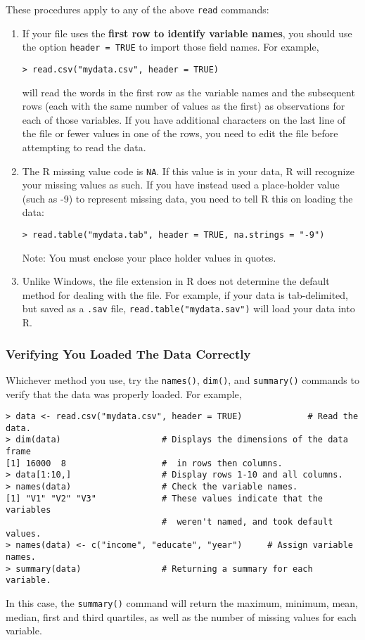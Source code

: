 These procedures apply to any of the above {\tt read} commands:
\begin{enumerate}
\item If your file uses the \textbf{first row to identify variable
    names}, you should use the option \texttt{header = TRUE} to import
  those field names.  For example,
\begin{verbatim}  
> read.csv("mydata.csv", header = TRUE)
\end{verbatim}
  will read the words in the first row as the variable names and the
  subsequent rows (each with the same number of values as the first)
  as observations for each of those variables. If you have additional
  characters on the last line of the file or fewer values in one of
  the rows, you need to edit the file before attempting to read the
  data.
\item The R missing value code is \texttt{NA}.  If this value is in
  your data, R will recognize your missing values as such.  If you
  have instead used a place-holder value (such as -9) to represent
  missing data, you need to tell R this on loading the data:
\begin{verbatim}
> read.table("mydata.tab", header = TRUE, na.strings = "-9")
\end{verbatim}
  Note: You must enclose your place holder values in quotes.
\item Unlike Windows, the file extension in R does not determine the
  default method for dealing with the file.  For example, if your data
  is tab-delimited, but saved as a {\tt .sav} file,
  \texttt{read.table("mydata.sav")} will load your data into R.
\end{enumerate}

\subsubsection*{Verifying You Loaded The Data Correctly}

Whichever method you use, try the \texttt{names()}, \texttt{dim()},
and \texttt{summary()} commands to verify that the data was properly
loaded.  For example,
\begin{verbatim}
> data <- read.csv("mydata.csv", header = TRUE)             # Read the data.
> dim(data)                    # Displays the dimensions of the data frame
[1] 16000  8                   #  in rows then columns.   
> data[1:10,]                  # Display rows 1-10 and all columns.
> names(data)                  # Check the variable names.
[1] "V1" "V2" "V3"             # These values indicate that the variables  
                               #  weren't named, and took default values.
> names(data) <- c("income", "educate", "year")     # Assign variable names. 
> summary(data)                # Returning a summary for each variable.  
\end{verbatim}
In this case, the {\tt summary()} command will return the maximum,
minimum, mean, median, first and third quartiles, as well as the
number of missing values for each variable.

